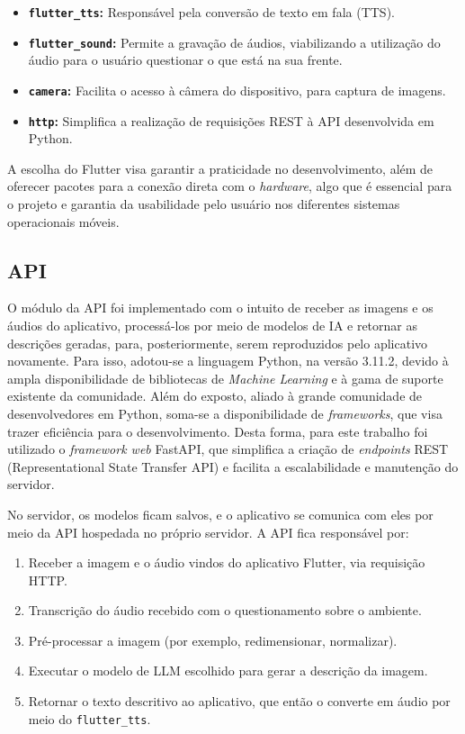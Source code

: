 \begin{itemize}
    \item \textbf{\lstinline{flutter_tts}:} Responsável pela conversão de texto em fala (TTS).
    \item \textbf{\lstinline{flutter_sound}:} Permite a gravação de áudios, viabilizando a utilização do áudio para o usuário questionar o que está na sua frente.
    \item \textbf{\lstinline{camera}:} Facilita o acesso à câmera do dispositivo, para captura de imagens.
    \item \textbf{\lstinline{http}:} Simplifica a realização de requisições REST à API desenvolvida em Python.
\end{itemize}

A escolha do Flutter visa garantir a praticidade no desenvolvimento, além de oferecer pacotes para a conexão direta com o \textit{hardware}, algo que é essencial para o projeto e garantia da usabilidade pelo usuário nos diferentes sistemas operacionais móveis.

\subsection{API}

O módulo da API foi implementado com o intuito de receber as imagens e os áudios do aplicativo, processá-los por meio de modelos de IA e retornar as descrições geradas, para, posteriormente, serem reproduzidos pelo aplicativo novamente. Para isso, adotou-se a linguagem Python, na versão 3.11.2, devido à ampla disponibilidade de bibliotecas de \textit{Machine Learning} e à gama de suporte existente da comunidade. Além do exposto, aliado à grande comunidade de desenvolvedores em Python, soma-se a disponibilidade de \textit{frameworks}, que visa trazer eficiência para o desenvolvimento. Desta forma, para este trabalho foi utilizado o \textit{framework web} FastAPI, que simplifica a criação de \textit{endpoints} REST (Representational State Transfer API) e facilita a escalabilidade e manutenção do servidor.

No servidor, os modelos ficam salvos, e o aplicativo se comunica com eles por meio da API hospedada no próprio servidor. A API fica responsável por:

\begin{enumerate}
    \item Receber a imagem e o áudio vindos do aplicativo Flutter, via requisição HTTP.
    \item Transcrição do áudio recebido com o questionamento sobre o ambiente.
    \item Pré-processar a imagem (por exemplo, redimensionar, normalizar).
    \item Executar o modelo de LLM escolhido para gerar a descrição da imagem.
    \item Retornar o texto descritivo ao aplicativo, que então o converte em áudio por meio do \lstinline{flutter_tts}.
\end{enumerate}

